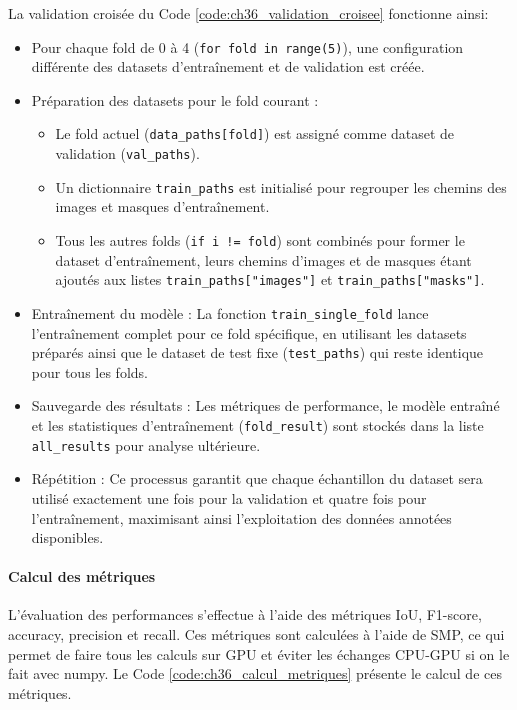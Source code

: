 La validation croisée du Code \ref{code:ch36_validation_croisee} fonctionne ainsi:
\begin{itemize}
    \item Pour chaque fold de 0 à 4 (\texttt{for fold in range(5)}), une configuration différente des datasets d'entraînement et de validation est créée.
    \item Préparation des datasets pour le fold courant :
    \begin{itemize}
        \item Le fold actuel (\texttt{data\_paths[fold]}) est assigné comme dataset de validation (\texttt{val\_paths}).
        \item Un dictionnaire \texttt{train\_paths} est initialisé pour regrouper les chemins des images et masques d'entraînement.
        \item Tous les autres folds (\texttt{if i != fold}) sont combinés pour former le dataset d'entraînement, leurs chemins d'images et de masques étant ajoutés aux listes \texttt{train\_paths["images"]} et \texttt{train\_paths["masks"]}.
    \end{itemize}
    \item Entraînement du modèle : La fonction \texttt{train\_single\_fold} lance l'entraînement complet pour ce fold spécifique, en utilisant les datasets préparés ainsi que le dataset de test fixe (\texttt{test\_paths}) qui reste identique pour tous les folds.
    \item Sauvegarde des résultats : Les métriques de performance, le modèle entraîné et les statistiques d'entraînement (\texttt{fold\_result}) sont stockés dans la liste \texttt{all\_results} pour analyse ultérieure.
    \item Répétition : Ce processus garantit que chaque échantillon du dataset sera utilisé exactement une fois pour la validation et quatre fois pour l'entraînement, maximisant ainsi l'exploitation des données annotées disponibles.
\end{itemize}

\paragraph{Calcul des métriques}
L'évaluation des performances s'effectue à l'aide des métriques IoU, F1-score, accuracy, precision et recall. Ces métriques sont calculées à l'aide de SMP, ce qui permet de faire tous les calculs sur GPU et éviter les échanges CPU-GPU si on le fait avec numpy. Le Code \ref{code:ch36_calcul_metriques} présente le calcul de ces métriques.

